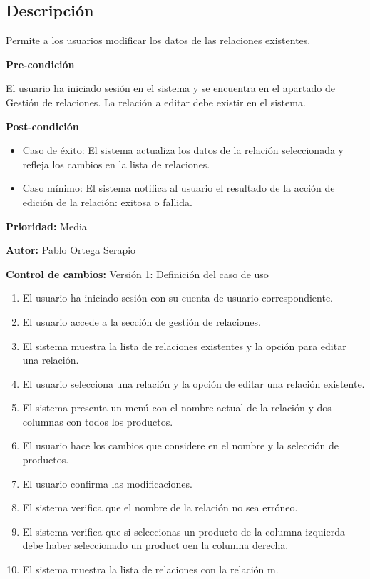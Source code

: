 
\subsection*{Descripción}
Permite a los usuarios modificar los datos de las relaciones existentes.\par
\vspace{0.15cm}

\textbf{Pre-condición}\par
El usuario ha iniciado sesión en el sistema y se encuentra en el apartado de Gestión de relaciones. La relación a editar debe existir en el sistema.\par
\vspace{0.15cm}

\textbf{Post-condición}
\begin{itemize}
    \item Caso de éxito: El sistema actualiza los datos de la relación seleccionada y refleja los cambios en la lista de relaciones.
    \item Caso mínimo: El sistema notifica al usuario el resultado de la acción de edición de la relación: exitosa o fallida.
\end{itemize}

\textbf{Prioridad: }
Media
\vspace{0.15cm}

\textbf{Autor: }
Pablo Ortega Serapio\par
\vspace{0.15cm}

\textbf{Control de cambios: } Versión 1: Definición del caso de uso

\begin{enumerate}
    \item El usuario ha iniciado sesión con su cuenta de usuario correspondiente.
    \item El usuario accede a la sección de gestión de relaciones.
    \item El sistema muestra la lista de relaciones existentes y la opción para editar una relación.
    \item El usuario selecciona una relación y la opción de editar una relación existente.
    \item El sistema presenta un menú con el nombre actual de la relación y dos columnas con todos los productos.
    \item El usuario hace los cambios que considere en el nombre y la selección de productos.
    \item El usuario confirma las modificaciones.
    \item El sistema verifica que el nombre de la relación no sea erróneo.
    \item El sistema verifica que si seleccionas un producto de la columna izquierda debe haber seleccionado un product oen la columna derecha.
    \item El sistema muestra la lista de relaciones con la relación m.
\end{enumerate}


